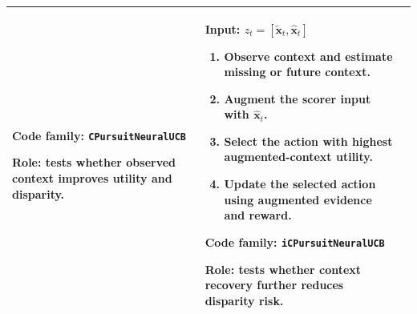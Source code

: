 \documentclass[conference]{IEEEtran}
\begin{document}
\begin{table}[!t]
\begin{tabular}{p{}p{}p{}}
\begin{minipage}[t]{0.30\textwidth}
\textbf{Code family:}
\texttt{CPursuitNeuralUCB}

\textbf{Role:} tests whether observed context improves utility and disparity.
\end{minipage}
&
\begin{minipage}[t]{0.30\textwidth}
\textbf{Input:} $z_t=[\tilde{\mathbf{x}}_t,\hat{\mathbf{x}}_t]$

\begin{enumerate}
\setlength\itemsep{0.15em}
\item Observe context and estimate missing or future context.
\item Augment the scorer input with $\hat{\mathbf{x}}_t$.
\item Select the action with highest augmented-context utility.
\item Update the selected action using augmented evidence and reward.
\end{enumerate}

\textbf{Code family:}
\texttt{iCPursuitNeuralUCB}

\textbf{Role:} tests whether context recovery further reduces disparity risk.
\end{minipage}
\\
\bottomrule
\end{tabular}
\end{table}
\end{document}
